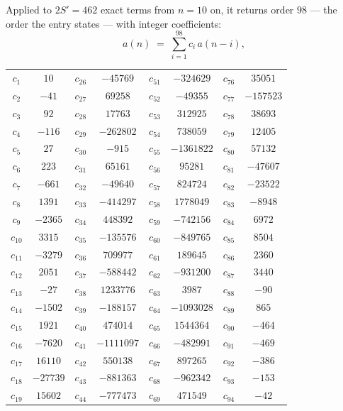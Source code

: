 \documentclass[11pt,a4paper]{article}
\theoremstyle{plain}
\theoremstyle{definition}
\begin{document}
Applied to $2S'=462$ exact terms from $n=10$ on, it returns order $98$ --- the
order the entry states --- with integer coefficients:
\[
a(n)\;=\;\sum_{i=1}^{98}c_i\,a(n-i),
\]
\begin{center}\small
\begin{tabular}{cccccccc}
$c_{1}$ & $10$ & $c_{26}$ & $-45769$ & $c_{51}$ & $-324629$ & $c_{76}$ & $35051$ \\
$c_{2}$ & $-41$ & $c_{27}$ & $69258$ & $c_{52}$ & $-49355$ & $c_{77}$ & $-157523$ \\
$c_{3}$ & $92$ & $c_{28}$ & $17763$ & $c_{53}$ & $312925$ & $c_{78}$ & $38693$ \\
$c_{4}$ & $-116$ & $c_{29}$ & $-262802$ & $c_{54}$ & $738059$ & $c_{79}$ & $12405$ \\
$c_{5}$ & $27$ & $c_{30}$ & $-915$ & $c_{55}$ & $-1361822$ & $c_{80}$ & $57132$ \\
$c_{6}$ & $223$ & $c_{31}$ & $65161$ & $c_{56}$ & $95281$ & $c_{81}$ & $-47607$ \\
$c_{7}$ & $-661$ & $c_{32}$ & $-49640$ & $c_{57}$ & $824724$ & $c_{82}$ & $-23522$ \\
$c_{8}$ & $1391$ & $c_{33}$ & $-414297$ & $c_{58}$ & $1778049$ & $c_{83}$ & $-8948$ \\
$c_{9}$ & $-2365$ & $c_{34}$ & $448392$ & $c_{59}$ & $-742156$ & $c_{84}$ & $6972$ \\
$c_{10}$ & $3315$ & $c_{35}$ & $-135576$ & $c_{60}$ & $-849765$ & $c_{85}$ & $8504$ \\
$c_{11}$ & $-3279$ & $c_{36}$ & $709977$ & $c_{61}$ & $189645$ & $c_{86}$ & $2360$ \\
$c_{12}$ & $2051$ & $c_{37}$ & $-588442$ & $c_{62}$ & $-931200$ & $c_{87}$ & $3440$ \\
$c_{13}$ & $-27$ & $c_{38}$ & $1233776$ & $c_{63}$ & $3987$ & $c_{88}$ & $-90$ \\
$c_{14}$ & $-1502$ & $c_{39}$ & $-188157$ & $c_{64}$ & $-1093028$ & $c_{89}$ & $865$ \\
$c_{15}$ & $1921$ & $c_{40}$ & $474014$ & $c_{65}$ & $1544364$ & $c_{90}$ & $-464$ \\
$c_{16}$ & $-7620$ & $c_{41}$ & $-1111097$ & $c_{66}$ & $-482991$ & $c_{91}$ & $-469$ \\
$c_{17}$ & $16110$ & $c_{42}$ & $550138$ & $c_{67}$ & $897265$ & $c_{92}$ & $-386$ \\
$c_{18}$ & $-27739$ & $c_{43}$ & $-881363$ & $c_{68}$ & $-962342$ & $c_{93}$ & $-153$ \\
$c_{19}$ & $15602$ & $c_{44}$ & $-777473$ & $c_{69}$ & $471549$ & $c_{94}$ & $-42$ \\

\end{tabular}
\end{center}
\end{document}
